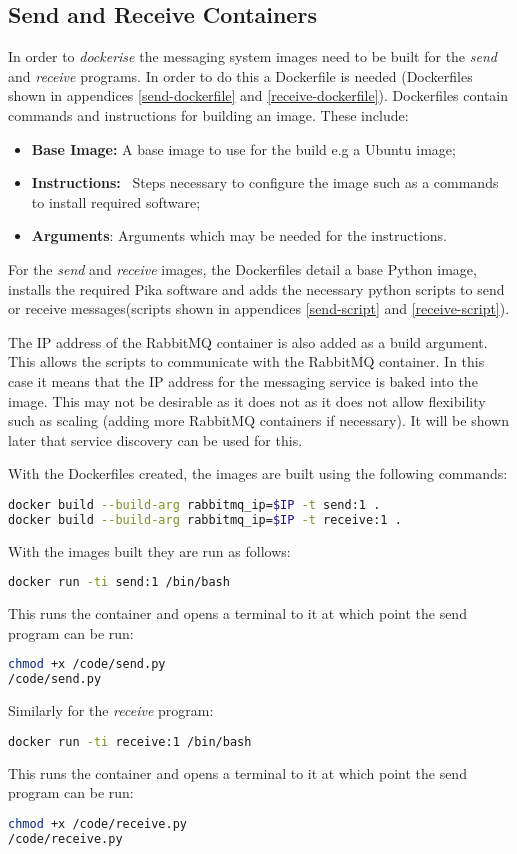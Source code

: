 \subsection{Send and Receive Containers}
In order to \textit{dockerise} the messaging system images need to be built for the \textit{send} and \textit{receive} programs. In order to do this a Dockerfile is needed (Dockerfiles shown in appendices \ref{send-dockerfile} and \ref{receive-dockerfile}).
Dockerfiles contain commands and instructions for building an image. These include:
\begin{itemize}
	\item \textbf{Base Image:} A base image to use for the build e.g a Ubuntu image;
	\item \textbf{Instructions:} ~Steps necessary to configure the image such as a commands to install required software;
	\item \textbf{Arguments}: Arguments which may be needed for the instructions.
\end{itemize}
For the \textit{send} and \textit{receive} images, the Dockerfiles detail a base Python image, installs the required Pika software and adds the necessary python scripts to send or receive messages(scripts shown in appendices \ref{send-script} and \ref{receive-script}).

The IP address of the RabbitMQ container is also added as a build argument. This allows the scripts to communicate with the RabbitMQ container. In this case it means that the IP address for the messaging service is baked into the image. This may not be desirable as it does not as it does not allow flexibility such as scaling (adding more RabbitMQ containers if necessary). It will be shown later that service discovery can be used for this.

With the Dockerfiles created, the images are built using the following commands:
\begin{lstlisting}[language=bash]
docker build --build-arg rabbitmq_ip=$IP -t send:1 .
docker build --build-arg rabbitmq_ip=$IP -t receive:1 .
\end{lstlisting}

With the images built they are run as follows:
\begin{lstlisting}[language=bash]
docker run -ti send:1 /bin/bash
\end{lstlisting}
This runs the container and opens a terminal to it at which point the send program can be run:
\begin{lstlisting}[language=bash]
chmod +x /code/send.py
/code/send.py
\end{lstlisting}
Similarly for the \textit{receive} program:
\begin{lstlisting}[language=bash]
docker run -ti receive:1 /bin/bash
\end{lstlisting}
This runs the container and opens a terminal to it at which point the send program can be run:
\begin{lstlisting}[language=bash]
chmod +x /code/receive.py
/code/receive.py
\end{lstlisting}

